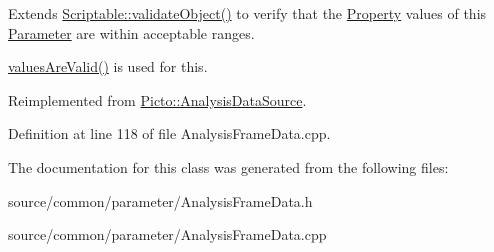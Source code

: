 Extends \hyperlink{class_picto_1_1_scriptable_ab6e2944c43a3b5d418bf7b251594386d}{Scriptable\-::validate\-Object()} to verify that the \hyperlink{class_picto_1_1_property}{Property} values of this \hyperlink{class_picto_1_1_parameter}{Parameter} are within acceptable ranges. 

\hyperlink{class_picto_1_1_parameter_a3443808da4c3edf26f2c3c3772d95b10}{values\-Are\-Valid()} is used for this. 

Reimplemented from \hyperlink{class_picto_1_1_analysis_data_source_a8d43777d1a7d1b1467c9df205d118bb3}{Picto\-::\-Analysis\-Data\-Source}.



Definition at line 118 of file Analysis\-Frame\-Data.\-cpp.



The documentation for this class was generated from the following files\-:\begin{DoxyCompactItemize}
\item 
source/common/parameter/Analysis\-Frame\-Data.\-h\item 
source/common/parameter/Analysis\-Frame\-Data.\-cpp\end{DoxyCompactItemize}
